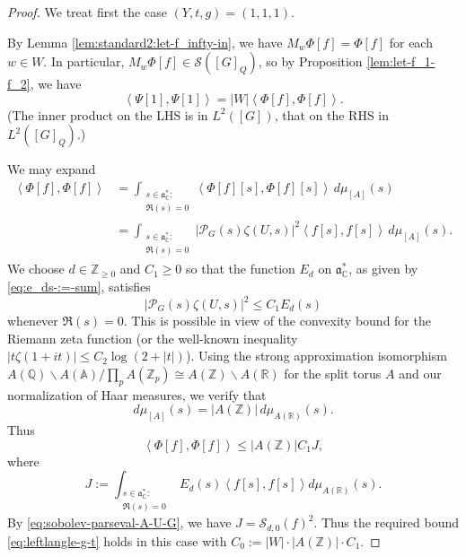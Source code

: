 \documentclass[reqno]{amsart}
\theoremstyle{plain} \newtheorem{theorem} {Theorem}
\theoremstyle{definition} \newtheorem{definition} [theorem] {Definition}
\theoremstyle{itplain} %
\numberwithin{equation}{section}
\numberwithin{theorem}{section}
\renewcommand{\geq}{\geqslant}
\renewcommand{\leq}{\leqslant}
\begin{document}
\begin{proof}
  We treat first the case $(Y,t,g) = (1,1,1)$.

  By Lemma \ref{lem:standard2:let-f_infty-in}, we have $M_w \Phi[f] = \Phi[f]$ for each $w \in W$.  In particular, $M_w \Phi[f] \in \mathcal{S}([G]_Q)$, so by Proposition \ref{lem:let-f_1-f_2}, we have
  \begin{equation*}
    \left\langle \Psi[1], \Psi[1]  \right\rangle
    = |W| \left\langle \Phi[f], \Phi[f] \right\rangle.
  \end{equation*}
  (The inner product on the LHS is in $L^2([G])$, that on the RHS in $L^2([G]_Q)$.)

  We may expand
  \begin{align*}
    \left\langle \Phi[f], \Phi[f] \right\rangle
    &=
    \int _{
      \substack{
        s \in \mathfrak{a}_{\mathbb{C}}^* :  \\
         \Re(s) = 0
      }
    }
    \left\langle \Phi[f][s], \Phi[f][s] \right\rangle \, d \mu_{[A]}(s) \\
    &=
    \int _{
      \substack{
        s \in \mathfrak{a}_{\mathbb{C}}^* :  \\
         \Re(s) = 0
      }
    }
    |\mathcal{P}_G(s) \zeta(U,s)|^2
    \left\langle f[s], f[s] \right\rangle \, d \mu_{[A]}(s).
  \end{align*}
  We choose $d \in \mathbb{Z}_{\geq 0}$ and $C_1 \geq 0$ so that the function $E_d$ on $\mathfrak{a}_{\mathbb{C}}^*$, as given by \eqref{eq:e_ds-:=-sum}, satisfies
  \begin{equation*}
    |\mathcal{P}_G(s) \zeta(U,s)|^2 \leq C_1 E_d(s)
  \end{equation*}
  whenever $\Re(s) = 0$.  This is possible in view of the convexity bound for the Riemann zeta function (or the well-known inequality $|t \zeta(1+it)| \leq C_2 \log(2 + |t|)$).  Using the strong approximation isomorphism $A(\mathbb{Q}) \backslash A(\mathbb{A}) / \prod_p A(\mathbb{Z}_p) \cong  A(\mathbb{Z})  \backslash A(\mathbb{R})$ for the split torus $A$ and our normalization of Haar measures, we verify that
  \begin{equation*}
    d \mu_{[A]}(s) = |A(\mathbb{Z})|\,  d \mu_{A(\mathbb{R})}(s).
  \end{equation*}
  Thus
  \begin{equation*}
    \left\langle \Phi[f], \Phi[f] \right\rangle \leq |A(\mathbb{Z})| C_1 J,
  \end{equation*}
  where
  \begin{equation*}
    J := \int _{
      \substack{
        s \in \mathfrak{a}_\mathbb{C}^* :  \\
         \Re(s)  = 0 
      }
    }
    E_d(s) \left\langle f[s], f[s] \right\rangle d \mu_{A(\mathbb{R})}(s).
  \end{equation*}
  By \eqref{eq:sobolev-parseval-A-U-G}, we have $J = \mathcal{S}_{d,0}(f)^2$.  Thus the required bound \eqref{eq:leftlangle-g-t} holds in this case with $C_0 := |W| \cdot |A(\mathbb{Z})| \cdot  C_1$.


\end{proof}
\end{document}
